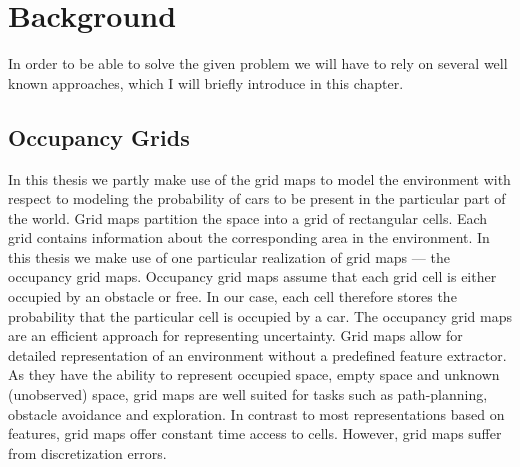 \chapter{Background}\label{cha:background}
    In order to be able to solve the given problem we will have to rely on several
    well known approaches, which I will briefly introduce in this chapter.
    \section{Occupancy Grids}\label{sec:occupancy_grids}

        In this thesis we partly
        make use of the grid maps to model the environment with respect to modeling
        the probability of cars to be present in the particular part of the world.
        Grid maps partition the space into a grid of rectangular cells. Each grid
        contains information about the corresponding area in the environment. In this
        thesis we make use of one particular realization of grid maps --- the
        occupancy grid maps. Occupancy grid maps assume that each grid cell is either
        occupied by an obstacle or free. In our case, each cell therefore stores the
        probability that the particular cell is occupied by a car. The occupancy grid
        maps are an efficient approach for representing uncertainty. Grid maps allow
        for detailed representation of an environment without a predefined feature
        extractor. As they have the ability to represent occupied space, empty space
        and unknown (unobserved) space, grid maps are well suited for tasks such as
        path-planning, obstacle avoidance and exploration. In contrast to most
        representations based on features, grid maps offer constant time access to
        cells. However, grid maps suffer from discretization errors.


